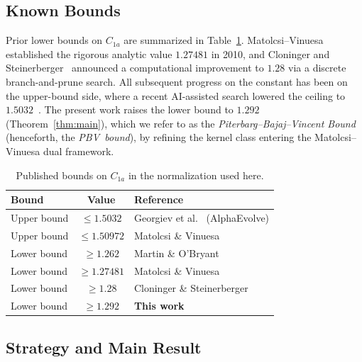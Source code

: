 \documentclass[11pt, letterpaper]{article}
\theoremstyle{paperplain}
\theoremstyle{paperdef}
\begin{document}
\subsection{Known Bounds}\label{subsec:intro-bounds}

Prior lower bounds on $C_{1a}$ are summarized in
Table~\ref{tab:published-bounds}.  Matolcsi--Vinuesa~\cite{MV10}
established the rigorous analytic value $1.27481$ in 2010, and
Cloninger and Steinerberger~\cite{CS17} announced a computational
improvement to $1.28$ via a discrete branch-and-prune search.  All
subsequent progress on the constant has been on the upper-bound
side, where a recent AI-assisted search lowered the ceiling to
$1.5032$~\cite{AlphaEvolve25}.  The present work raises the
lower bound to $1.292$ (Theorem~\ref{thm:main}), which we refer to as
the \emph{Piterbarg--Bajaj--Vincent Bound} (henceforth, the
\emph{PBV~bound}), by refining the kernel class entering the
Matolcsi--Vinuesa dual framework.

\begin{table}[ht]
\centering
\begin{tabular}{lcl}
  \toprule
  \textbf{Bound} & \textbf{Value} & \textbf{Reference} \\
  \midrule
  Upper bound & $\le 1.5032$  & Georgiev et al.~\cite{AlphaEvolve25} (AlphaEvolve) \\
  Upper bound & $\le 1.50972$ & Matolcsi \& Vinuesa~\cite{MV10} \\
  Lower bound & $\ge 1.262$   & Martin \& O'Bryant~\cite{MO2009} \\
  Lower bound & $\ge 1.27481$ & Matolcsi \& Vinuesa~\cite{MV10} \\
  Lower bound & $\ge 1.28$    & Cloninger \& Steinerberger~\cite{CS17} \\
  Lower bound & $\ge 1.292$   & \textbf{This work} \\
  \bottomrule
\end{tabular}
\caption[Published bounds on C1a in the normalization used here.]{Published bounds on $C_{1a}$ in the normalization used here.}
\label{tab:published-bounds}
\end{table}

\subsection{Strategy and Main Result}\label{subsec:intro-strategy}
\end{document}
